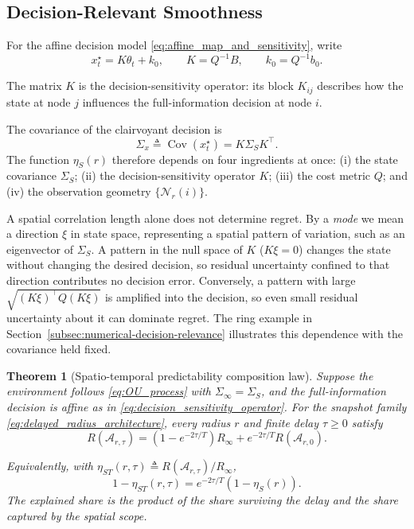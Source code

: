 \documentclass[11pt]{article}
\newtheorem{theorem}{Theorem}
\begin{document}
\subsection{Decision-Relevant Smoothness}
\label{subsec:decision_relevant_smoothness}

For the affine decision model \eqref{eq:affine_map_and_sensitivity}, write
\begin{equation}
x_t^\star=K\theta_t+k_0,\qquad K=Q^{-1}B,\qquad k_0=Q^{-1}b_0.
\label{eq:decision_sensitivity_operator}
\end{equation}

The matrix $K$ is the decision-sensitivity operator: its block $K_{ij}$
describes how the state at node $j$ influences the full-information decision
at node $i$.

The covariance of the clairvoyant decision is
\begin{equation}
    \Sigma_x
    \triangleq
    \operatorname{Cov}(x_t^\star)
    =
    K\Sigma_S K^\top.
    \label{eq:decision_covariance}
\end{equation}
The function $\eta_S(r)$ therefore depends on four ingredients at once: (i) the state covariance $\Sigma_S$; (ii) the decision-sensitivity operator $K$; (iii) the cost metric $Q$; and (iv) the observation geometry $\{\mathcal N_r(i)\}$.

A spatial correlation length alone does not determine regret. By a \emph{mode} we mean a direction $\xi$ in state space, representing a spatial pattern of variation, such as an eigenvector of $\Sigma_S$. A pattern in the null space of $K$ ($K\xi=0$) changes the state without changing the desired decision, so residual uncertainty confined to that direction contributes no decision error. Conversely, a pattern with large $\sqrt{(K\xi)^\top Q(K\xi)}$ is amplified into the decision, so even small residual uncertainty about it can dominate regret. The ring example in Section~\ref{subsec:numerical-decision-relevance} illustrates this dependence with the covariance held fixed.

\begin{theorem}[Spatio-temporal predictability composition law]
\label{thm:spatiotemporal_composition}
Suppose the environment follows \eqref{eq:OU_process} with
$\Sigma_\infty=\Sigma_S$, and the full-information decision is affine
as in \eqref{eq:decision_sensitivity_operator}. For the snapshot family
\eqref{eq:delayed_radius_architecture}, every radius $r$ and finite delay
$\tau\ge0$ satisfy
\begin{equation}
    \boxed{
    R(\mathcal{A}_{r,\tau})
    =
    \left(
        1-e^{-2\tau/T}
    \right)R_\infty
    +
    e^{-2\tau/T}
    R(\mathcal{A}_{r,0}).
    }
    \label{eq:regret_composition_unnormalized}
\end{equation}

Equivalently, with $\eta_{ST}(r,\tau)\triangleq R(\mathcal A_{r,\tau})/R_\infty$,
\begin{equation}
1-\eta_{ST}(r,\tau)=e^{-2\tau/T}(1-\eta_S(r)).
\label{eq:regret_composition_normalized}
\end{equation}
The explained share is the product of the share surviving the delay and the
share captured by the spatial scope.
\end{theorem}
\end{document}
